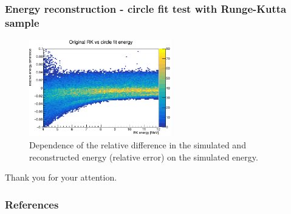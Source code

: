 \documentclass{beamer}
\begin{document}
	\begin{frame}
	\frametitle{Energy reconstruction - circle fit test with Runge-Kutta sample}
		\begin{figure}
			\centering
			\includegraphics[width=0.55\textwidth]{../images/rk_energy_reldiff.png}
			\caption{Dependence of the relative difference in the simulated and reconstructed energy (relative error) on the simulated energy.}
		\end{figure}
	\end{frame}
	
	{
		\begin{frame}[noframenumbering]{}
			\begin{center}
				\Huge Thank you for your attention.
			\end{center}
		\end{frame}
	}
	
	\begin{frame}
		\frametitle{References}
		
		
	\end{frame}
	
\end{document}
